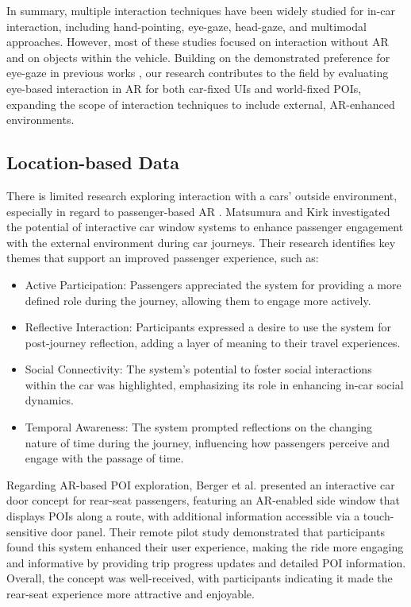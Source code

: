 In summary, multiple interaction techniques have been widely studied for in-car interaction, including hand-pointing, eye-gaze, head-gaze, and multimodal approaches. However, most of these studies focused on interaction without AR and on objects within the vehicle. Building on the demonstrated preference for eye-gaze in previous works \cite{blattgerste2018advantages, luro2019comparative, Schramm2023Assessing}, our research contributes to the field by evaluating eye-based interaction in AR for both car-fixed UIs and world-fixed POIs, expanding the scope of interaction techniques to include external, AR-enhanced environments.



\subsection{Location-based Data}
There is limited research exploring interaction with a cars' outside environment, especially in regard to passenger-based AR \cite{Berger21InteractiveCarDoor}. Matsumura and Kirk \cite{MatsumuraActivePassengering18} investigated the potential of interactive car window systems to enhance passenger engagement with the external environment during car journeys. Their research identifies key themes that support an improved passenger experience, such as:
\begin{itemize}
    \item Active Participation: Passengers appreciated the system for providing a more defined role during the journey, allowing them to engage more actively.
    \item Reflective Interaction: Participants expressed a desire to use the system for post-journey reflection, adding a layer of meaning to their travel experiences.
    \item Social Connectivity: The system's potential to foster social interactions within the car was highlighted, emphasizing its role in enhancing in-car social dynamics.
    \item Temporal Awareness: The system prompted reflections on the changing nature of time during the journey, influencing how passengers perceive and engage with the passage of time.
\end{itemize}

Regarding AR-based POI exploration, Berger et al. \cite{Berger21InteractiveCarDoor} presented an interactive car door concept for rear-seat passengers, featuring an AR-enabled side window that displays POIs along a route, with additional information accessible via a touch-sensitive door panel. Their remote pilot study demonstrated that participants found this system enhanced their user experience, making the ride more engaging and informative by providing trip progress updates and detailed POI information. Overall, the concept was well-received, with participants indicating it made the rear-seat experience more attractive and enjoyable.

